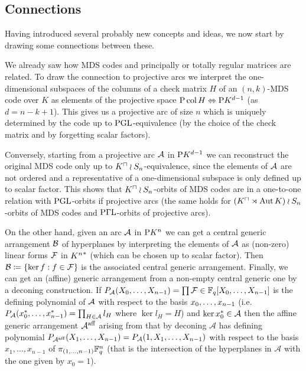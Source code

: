 \subsection{Connections}

Having introduced several probably new concepts and ideas, we now start by drawing some connections between these.

We already saw how MDS codes and principally or totally regular matrices are related.
To draw the connection to projective arcs we interpret the one-dimensional subspaces of the columns of a check matrix $H$ of an $(n,k)$-MDS code over $K$ as elements of the projective space $\P \col H\iso \P K^{d-1}$ (as $d=n-k+1$). This gives us a projective arc of size $n$ which is uniquely determined by the code up to $\mathrm{PGL}$-equivalence (by the choice of the check matrix and by forgetting scalar factors).

Conversely, starting from a projective arc $\mathcal{A}$ in $\P K^{d-1}$ we can reconstruct the original MDS code only up to $\units K\wr S_n$-equivalence, since the elements of $\mathcal{A}$ are not ordered and a representative of a one-dimensional subspace is only defined up to scalar factor. This shows that $\units K\wr S_n$-orbits of MDS codes are in a one-to-one relation with $\mathrm{PGL}$-orbits if projective arcs (the same holds for $(\units K\rtimes \Aut K)\wr S_n$-orbits of MDS codes and $\mathrm{P\Gamma L}$-orbits of projective arcs).

On the other hand, given an arc $\mathcal{A}$ in $\P K^n$ we can get a central generic arrangement $\mathcal{B}$ of hyperplanes by interpreting the elements of $\mathcal{A}$ as (non-zero) linear forms $\mathcal{F}$ in ${K^n}^{\ast}$ (which can be chosen up to scalar factor). Then $\cB\defeq\set{\ker f}[f\in \cF]$ is the associated central generic arrangement.
Finally, we can get an (affine) generic arrangement from a non-empty
central generic one by a deconing construction. If
$P_{\cA}(\range{X_0}{X_{n-1}})=\prod{\cF}\in\field{q}[X_0,\ldots,X_{n-1}]$
is the defining polynomial of $\mathcal{A}$ with respect to the basis
$\range{x_0}{x_{n-1}}$ (i.e. $P_\cA(\range{\dual x_0}{\dual
    x_{n-1}})=\prod_{H\in\cA}{l_H}$ where $\ker l_H =H$) 
and $\ker{x}^{\ast}_0\in\mathcal{A}$ then the affine
generic arrangement $\mathcal{A}^{\mathop\mathrm{aff}}$
arising  from that by deconing $\mathcal{A}$ has defining polynomial $P_{\mathcal{A}^{\mathop\mathrm{aff}}}(X_1,\ldots,X_{n-1})=P_{\mathcal{A}}(1,X_1,\ldots,X_{n-1})$ with respect to the basis $x_1,\ldots,x_{n-1}$ of $\pi_{(1,\ldots,n-1)}\mathbb{F}_{q}^n$ (that is the intersection of the hyperplanes in $\mathcal{A}$ with the one given by $x_0=1$).

